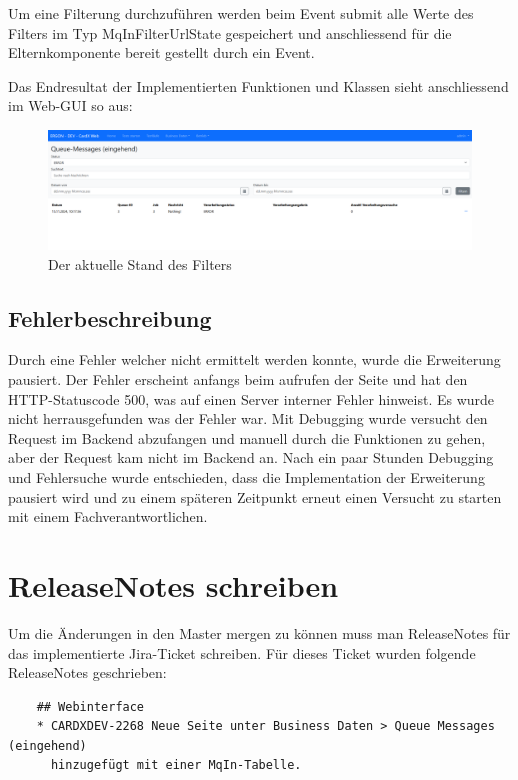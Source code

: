 Um eine Filterung durchzuführen werden beim Event submit alle Werte des Filters im Typ MqInFilterUrlState gespeichert und anschliessend für die Elternkomponente bereit gestellt durch ein Event.

Das Endresultat der Implementierten Funktionen und Klassen sieht anschliessend im Web-GUI so aus:

\begin{figure}[H]
	\begin{center}
		\includegraphics[width=1\textwidth]{ressourcen/Filterung}
		\caption[Der aktuelle Stand des Filters]{Der aktuelle Stand des Filters}\label{fig:filtering-v1}
	\end{center}
\end{figure}

\subsection{Fehlerbeschreibung}
Durch eine Fehler welcher nicht ermittelt werden konnte, wurde die Erweiterung pausiert. Der Fehler erscheint anfangs beim aufrufen der Seite und hat den HTTP-Statuscode 500, was auf einen Server interner Fehler hinweist. Es wurde nicht herrausgefunden was der Fehler war. Mit Debugging wurde versucht den Request im Backend abzufangen und manuell durch die Funktionen zu gehen, aber der Request kam nicht im Backend an. Nach ein paar Stunden Debugging und Fehlersuche wurde entschieden, dass die Implementation der Erweiterung pausiert wird und zu einem späteren Zeitpunkt erneut einen Versucht zu starten mit einem Fachverantwortlichen.

\section{ReleaseNotes schreiben}
Um die Änderungen in den Master mergen zu können muss man ReleaseNotes für das implementierte Jira-Ticket schreiben. Für dieses Ticket wurden folgende ReleaseNotes geschrieben:

\begin{verbatim}
	## Webinterface
	* CARDXDEV-2268 Neue Seite unter Business Daten > Queue Messages (eingehend)
	  hinzugefügt mit einer MqIn-Tabelle.
\end{verbatim}
\newpage